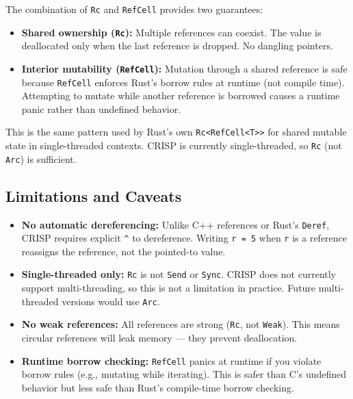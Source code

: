 \begin{tcolorbox}[colback=lightlavender, colframe=softvioletdark, title=\textbf{\textcolor{darkpurple}{Design Note: Why Rc<RefCell<Value>>?}}, fonttitle=\bfseries, sharp corners]
The combination of \texttt{Rc} and \texttt{RefCell} provides two guarantees:

\begin{itemize}
    \item \textbf{Shared ownership (\texttt{Rc}):} Multiple references can coexist. The value is deallocated only when the last reference is dropped. No dangling pointers.
    \item \textbf{Interior mutability (\texttt{RefCell}):} Mutation through a shared reference is safe because \texttt{RefCell} enforces Rust's borrow rules at runtime (not compile time). Attempting to mutate while another reference is borrowed causes a runtime panic rather than undefined behavior.
\end{itemize}

This is the same pattern used by Rust's own \texttt{Rc<RefCell<T>>} for shared mutable state in single-threaded contexts. CRISP is currently single-threaded, so \texttt{Rc} (not \texttt{Arc}) is sufficient.
\end{tcolorbox}

\subsection{Limitations and Caveats}

\begin{tcolorbox}[colback=softviolet!20, colframe=warningred, title=\textbf{\textcolor{warningred}{Caveats}}, fonttitle=\bfseries, sharp corners]
\begin{itemize}
    \item \textbf{No automatic dereferencing:} Unlike C++ references or Rust's \texttt{Deref}, CRISP requires explicit \texttt{\textasciicircum} to dereference. Writing \texttt{r = 5} when \texttt{r} is a reference reassigns the reference, not the pointed-to value.
    \item \textbf{Single-threaded only:} \texttt{Rc} is not \texttt{Send} or \texttt{Sync}. CRISP does not currently support multi-threading, so this is not a limitation in practice. Future multi-threaded versions would use \texttt{Arc}.
    \item \textbf{No weak references:} All references are strong (\texttt{Rc}, not \texttt{Weak}). This means circular references will leak memory — they prevent deallocation.
    \item \textbf{Runtime borrow checking:} \texttt{RefCell} panics at runtime if you violate borrow rules (e.g., mutating while iterating). This is safer than C's undefined behavior but less safe than Rust's compile-time borrow checking.
\end{itemize}
\end{tcolorbox}

